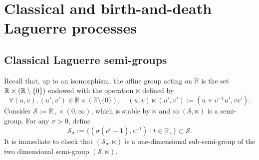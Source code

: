 \documentclass[AHL,Unicode,longabstracts]{cedram}
\newcommand{\df}{\mathrel{:=}}
\newcommand{\cS}{{\mathcal S}}
\newcommand{\RR}{\mathbb{R}}
\newcommand{\iy}{\infty}
\newcommand{\st}{\,:\,}
\let\oldforall\forall
\renewcommand*{\forall}{\mathrel{\oldforall}}
\begin{document}
\section{Classical and birth-and-death Laguerre processes}\label{cabadLp}

\subsection{Classical Laguerre semi-groups}\label{cLp}

Recall that, up to an isomorphism, the affine group acting on $\RR$ is the set $\RR\times\linebreak (\RR\setminus\{0\})$ endowed with the operation $\ltimes$ defined by
\[
\forall (u,v), (u',v')\in\RR\times (\RR\setminus\{0\}),\quad (u,v)\ltimes (u',v')\df (u+v^{-1}u', vv').
\]
Consider $\cS\df \RR_+\times (0,\iy)$, which is stable by $\ltimes$ and so $(\cS, \ltimes)$ is a semi-group. For any $\sigma>0$, define
\[
\cS_\sigma\df \{(\sigma(e^{t}-1),e^{-t})\st t\in\RR_+\} \subset \cS.
\]
It is immediate to check that $(\cS_\sigma,\ltimes)$ is a one-dimensional sub-semi-group of the two dimensional semi-group $(\cS, \ltimes)$.
\end{document}
